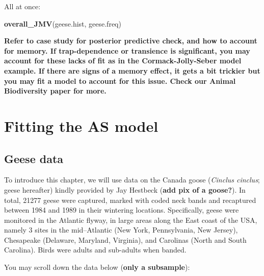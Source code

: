 \documentclass[
  12pt,
]{krantz}
\newenvironment{Shaded}{\begin{snugshade}}{\end{snugshade}}
\newcommand{\FunctionTok}[1]{\textcolor[rgb]{0.13,0.29,0.53}{\textbf{#1}}}
\newcommand{\NormalTok}[1]{#1}
\begin{document}
All at once:

\begin{Shaded}
\begin{Highlighting}[]
\FunctionTok{overall\_JMV}\NormalTok{(geese.hist, geese.freq)}
\end{Highlighting}
\end{Shaded}

\textbf{Refer to case study for posterior predictive check, and how to account for memory. If trap-dependence or transience is significant, you may account for these lacks of fit as in the Cormack-Jolly-Seber model example. If there are signs of a memory effect, it gets a bit trickier but you may fit a model to account for this issue. Check our Animal Biodiversity paper for more.}

\hypertarget{ASmodelfitting}{%
\section{Fitting the AS model}\label{ASmodelfitting}}

\hypertarget{geese-data}{%
\subsection{Geese data}\label{geese-data}}

To introduce this chapter, we will use data on the Canada goose (\emph{Cinclus cinclus}; geese hereafter) kindly provided by Jay Hestbeck (\textbf{add pix of a goose?}). In total, 21277 geese were captured, marked with coded neck bands and recaptured between 1984 and 1989 in their wintering locations. Specifically, geese were monitored in the Atlantic flyway, in large areas along the East coast of the USA, namely 3 sites in the mid--Atlantic (New York, Pennsylvania, New Jersey), Chesapeake (Delaware, Maryland, Virginia), and Carolinas (North and South Carolina). Birds were adults and sub-adults when banded.

You may scroll down the data below (\textbf{only a subsample}):
\end{document}

